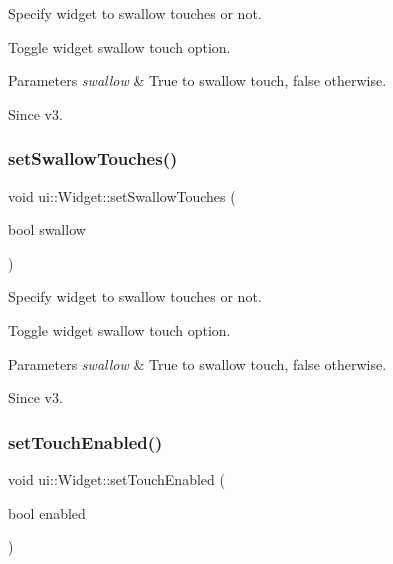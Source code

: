 Specify widget to swallow touches or not. 

Toggle widget swallow touch option. 
\begin{DoxyParams}{Parameters}
{\em swallow} & True to swallow touch, false otherwise. \\
\hline
\end{DoxyParams}
\begin{DoxySince}{Since}
v3. 
\end{DoxySince}
\mbox{\label{classui_1_1Widget_a6c032c79a09975f53518172606f07c14}} 
\subsubsection{\texorpdfstring{set\+Swallow\+Touches()}{setSwallowTouches()}\hspace{0.1cm}{\footnotesize\ttfamily [2/2]}}
{\footnotesize\ttfamily void ui\+::\+Widget\+::set\+Swallow\+Touches (\begin{DoxyParamCaption}\item[{bool}]{swallow }\end{DoxyParamCaption})}



Specify widget to swallow touches or not. 

Toggle widget swallow touch option. 
\begin{DoxyParams}{Parameters}
{\em swallow} & True to swallow touch, false otherwise. \\
\hline
\end{DoxyParams}
\begin{DoxySince}{Since}
v3. 
\end{DoxySince}
\mbox{\label{classui_1_1Widget_afd236dbe16327a48db557c58d2d2f991}} 
\subsubsection{\texorpdfstring{set\+Touch\+Enabled()}{setTouchEnabled()}\hspace{0.1cm}{\footnotesize\ttfamily [1/2]}}
{\footnotesize\ttfamily void ui\+::\+Widget\+::set\+Touch\+Enabled (\begin{DoxyParamCaption}\item[{bool}]{enabled }\end{DoxyParamCaption})\hspace{0.3cm}{\ttfamily [virtual]}}

